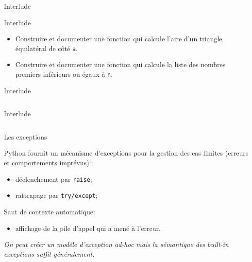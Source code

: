 \documentclass[dvipsnames]{beamer}
\def\interlude{
\begin{frame}[standout]
Interlude\\[1em]
    \centerline{\decothreeleft\;\rotatebox[origin=c]{180}{\decothreeleft}}
\end{frame}
}
\begin{document}
\interlude

\begin{frame}
    [fragile]{Interlude}

    \begin{itemize}
        \setlength{\itemsep}{0pt}\setlength{\parskip}{1em}
        \item Construire et documenter une fonction qui calcule l'aire d'un
              triangle équilatéral de côté \texttt{a}.
        \item Construire et documenter une fonction qui calcule la liste des
              nombres premiers inférieurs ou égaux à \texttt{n}.
    \end{itemize}
\end{frame}

\begin{frame} [fragile]{Interlude}
    \inputminted[fontsize=\scriptsize]{python3}{code/interlude_01_1.py}
\end{frame}
\begin{frame} [fragile]{Interlude}
    \inputminted[fontsize=\scriptsize]{python3}{code/interlude_01_2.py}
\end{frame}

\begin{frame}
    [fragile]{Les exceptions}

    Python fournit un mécanisme d'exceptions pour la gestion des cas limites
    (erreurs et comportements imprévus):
    \begin{itemize}
        \item déclenchement par \texttt{\small raise};
        \item rattrapage par \texttt{\small try/except};
    \end{itemize}

    Saut de contexte automatique:
    \begin{itemize}
        \item affichage de la pile d'appel qui a mené à l'erreur.
    \end{itemize}
    \vspace{1em}
    \emph{On peut créer un modèle d'exception ad-hoc mais la sémantique des
        \emph{built-in exceptions} suffit généralement.}

\end{frame}

\end{document}
